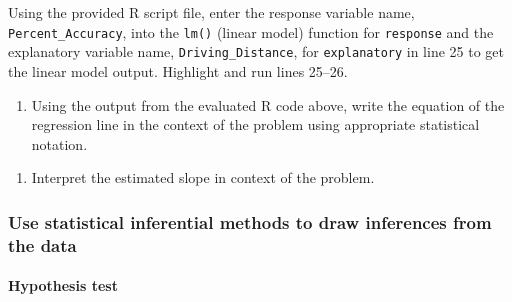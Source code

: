 \documentclass[
]{report}
\newenvironment{Shaded}{\begin{snugshade}}{\end{snugshade}}
\newcommand{\AttributeTok}[1]{\textcolor[rgb]{0.77,0.63,0.00}{#1}}
\newcommand{\CommentTok}[1]{\textcolor[rgb]{0.56,0.35,0.01}{\textit{#1}}}
\newcommand{\DecValTok}[1]{\textcolor[rgb]{0.00,0.00,0.81}{#1}}
\newcommand{\FunctionTok}[1]{\textcolor[rgb]{0.00,0.00,0.00}{#1}}
\newcommand{\NormalTok}[1]{#1}
\newcommand{\OtherTok}[1]{\textcolor[rgb]{0.56,0.35,0.01}{#1}}
\newcommand{\SpecialCharTok}[1]{\textcolor[rgb]{0.00,0.00,0.00}{#1}}
\providecommand{\tightlist}{%
  \setlength{\itemsep}{0pt}\setlength{\parskip}{0pt}}
\begin{document}
Using the provided R script file, enter the response variable name, \texttt{Percent\_Accuracy}, into the \texttt{lm()} (linear model) function for \texttt{response} and the explanatory variable name, \texttt{Driving\_Distance}, for \texttt{explanatory} in line 25 to get the linear model output. Highlight and run lines 25--26.

\begin{Shaded}
\end{Shaded}

\begin{enumerate}
\def\labelenumi{\arabic{enumi}.}
\setcounter{enumi}{4}
\tightlist
\item
  Using the output from the evaluated R code above, write the equation of the regression line in the context of the problem using appropriate statistical notation.
\end{enumerate}

\vspace{1in}

\begin{enumerate}
\def\labelenumi{\arabic{enumi}.}
\setcounter{enumi}{5}
\tightlist
\item
  Interpret the estimated slope in context of the problem.
\end{enumerate}

\vspace{1in}

\hypertarget{use-statistical-inferential-methods-to-draw-inferences-from-the-data-6}{%
\subsubsection*{Use statistical inferential methods to draw inferences from the data}\label{use-statistical-inferential-methods-to-draw-inferences-from-the-data-6}}

\hypertarget{hypothesis-test-3}{%
\paragraph*{Hypothesis test}\label{hypothesis-test-3}}
\end{document}
